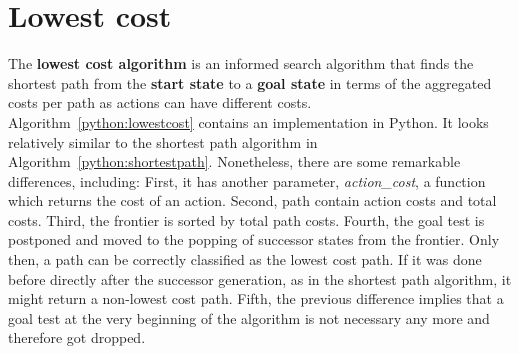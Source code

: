 \documentclass{report}
\begin{document}
\section{Lowest cost}
The {\bf lowest cost algorithm} is an informed search algorithm that finds the shortest path from the {\bf start state} to a {\bf goal state} in terms of the aggregated costs per path as actions can have different costs.
\\
Algorithm~\ref{python:lowestcost} contains an implementation in Python. It looks relatively similar to the shortest path algorithm in Algorithm~\ref{python:shortestpath}.
Nonetheless, there are some remarkable differences, including:
First, it has another parameter, {\em action\_cost}, a function which returns the cost of an action.
Second, path contain action costs and total costs.
Third, the frontier is sorted by total path costs.
Fourth, the goal test is postponed and moved to the popping of successor states from the frontier. Only then, a path can be correctly classified as the lowest cost path. If it was done before directly after the successor generation, as in the shortest path algorithm, it might return a non-lowest cost path.
Fifth, the previous difference implies that a goal test at the very beginning of the algorithm is not necessary any more and therefore got dropped.
\end{document}
